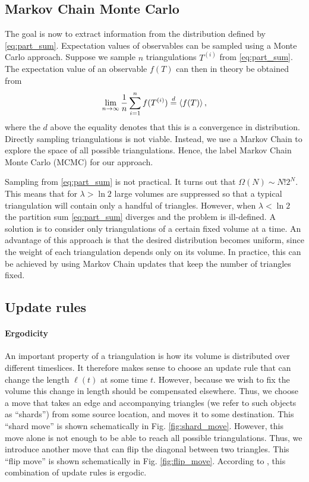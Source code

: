 
\subsection{Markov Chain Monte Carlo}

The goal is now to extract information from the distribution defined by \eqref{eq:part_sum}. Expectation values of observables can be sampled using a Monte Carlo approach. Suppose we sample $n$ triangulations $T^{(i)}$ from \eqref{eq:part_sum}. The expectation value of an observable $f(T)$ can then in theory be obtained from
\begin{equation}
    \lim_{n \to \infty} \frac{1}{n} \sum_{i = 1}^n f(T^{(i)})
    \overset{d}{=}
    \ev{f(T)}
    ,
\end{equation}
where the $d$ above the equality denotes that this is a convergence in distribution. Directly sampling triangulations is not viable. Instead, we use a Markov Chain to explore the space of all possible triangulations. Hence, the label Markov Chain Monte Carlo (MCMC) for our approach.

Sampling from \eqref{eq:part_sum} is not practical. It turns out that $\Omega(N) \sim N! 2^N$. This means that for $\lambda > \ln 2$ large volumes are suppressed so that a typical triangulation will contain only a handful of triangles.
However, when $\lambda < \ln 2$ the partition sum \eqref{eq:part_sum} diverges and the problem is ill-defined.
A solution is to consider only triangulations of a certain fixed volume at a time.
An advantage of this approach is that the desired distribution becomes uniform, since the weight of each triangulation depends only on its volume.
In practice, this can be achieved by using Markov Chain updates that keep the number of triangles fixed.

\subsection{Update rules}
\paragraph{Ergodicity}
An important property of a triangulation is how its volume is distributed over different timeslices. It therefore makes sense to choose an update rule that can change the length $\ell(t)$ at some time $t$. However, because we wish to fix the volume this change in length should be compensated elsewhere. Thus, we choose a move that takes an edge and accompanying triangles (we refer to such objects as ``shards'') from some source location, and moves it to some destination. This ``shard move'' is shown schematically in Fig. \ref{fig:shard_move}. However, this move alone is not enough to be able to reach all possible triangulations. Thus, we introduce another move that can flip the diagonal between two triangles. This ``flip move'' is shown schematically in Fig. \ref{fig:flip_move}. According to \cite{2012}, this combination of update rules is ergodic.

